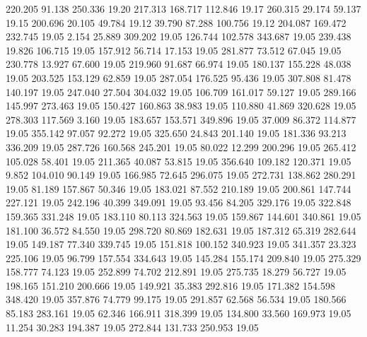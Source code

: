  220.205   91.138  250.336        19.20
 217.313  168.717  112.846        19.17
 260.315   29.174   59.137        19.15
 200.696   20.105   49.784        19.12
  39.790   87.288  100.756        19.12
 204.087  169.472  232.745        19.05
   2.154   25.889  309.202        19.05
 126.744  102.578  343.687        19.05
 239.438   19.826  106.715        19.05
 157.912   56.714   17.153        19.05
 281.877   73.512   67.045        19.05
 230.778   13.927   67.600        19.05
 219.960   91.687   66.974        19.05
 180.137  155.228   48.038        19.05
 203.525  153.129   62.859        19.05
 287.054  176.525   95.436        19.05
 307.808   81.478  140.197        19.05
 247.040   27.504  304.032        19.05
 106.709  161.017   59.127        19.05
 289.166  145.997  273.463        19.05
 150.427  160.863   38.983        19.05
 110.880   41.869  320.628        19.05
 278.303  117.569    3.160        19.05
 183.657  153.571  349.896        19.05
  37.009   86.372  114.877        19.05
 355.142   97.057   92.272        19.05
 325.650   24.843  201.140        19.05
 181.336   93.213  336.209        19.05
 287.726  160.568  245.201        19.05
  80.022   12.299  200.296        19.05
 265.412  105.028   58.401        19.05
 211.365   40.087   53.815        19.05
 356.640  109.182  120.371        19.05
   9.852  104.010   90.149        19.05
 166.985   72.645  296.075        19.05
 272.731  138.862  280.291        19.05
  81.189  157.867   50.346        19.05
 183.021   87.552  210.189        19.05
 200.861  147.744  227.121        19.05
 242.196   40.399  349.091        19.05
  93.456   84.205  329.176        19.05
 322.848  159.365  331.248        19.05
 183.110   80.113  324.563        19.05
 159.867  144.601  340.861        19.05
 181.100   36.572   84.550        19.05
 298.720   80.869  182.631        19.05
 187.312   65.319  282.644        19.05
 149.187   77.340  339.745        19.05
 151.818  100.152  340.923        19.05
 341.357   23.323  225.106        19.05
  96.799  157.554  334.643        19.05
 145.284  155.174  209.840        19.05
 275.329  158.777   74.123        19.05
 252.899   74.702  212.891        19.05
 275.735   18.279   56.727        19.05
 198.165  151.210  200.666        19.05
 149.921   35.383  292.816        19.05
 171.382  154.598  348.420        19.05
 357.876   74.779   99.175        19.05
 291.857   62.568   56.534        19.05
 180.566   85.183  283.161        19.05
  62.346  166.911  318.399        19.05
 134.800   33.560  169.973        19.05
  11.254   30.283  194.387        19.05
 272.844  131.733  250.953        19.05
